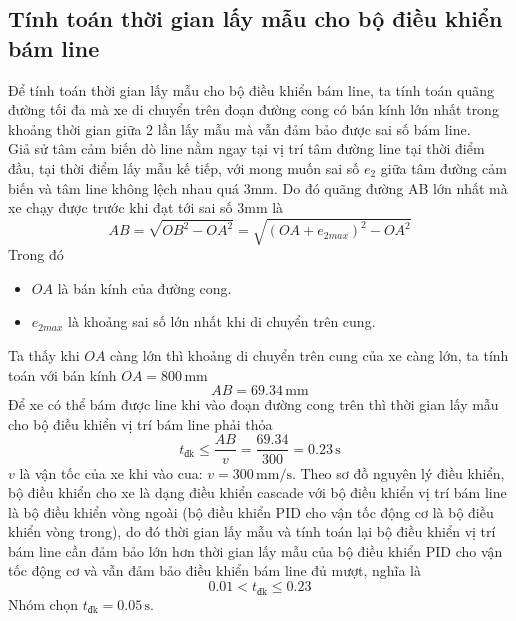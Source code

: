           \subsection{Tính toán thời gian lấy mẫu cho bộ điều khiển bám line}
               \hspace*{0.6cm}Để tính toán thời gian lấy mẫu cho bộ điều khiển bám line, ta tính toán quãng đường tối đa mà xe di chuyển trên đoạn đường cong 
               có bán kính lớn nhất trong khoảng thời gian giữa 2 lần lấy mẫu mà vẫn đảm bảo được sai số bám line.\\
               \hspace*{0.6cm}Giả sử tâm cảm biến dò line nằm ngay tại vị trí tâm đường line tại thời điểm đầu, tại thời điểm lấy mẫu kế tiếp, với mong muốn sai số $e_2$ giữa tâm đường cảm biến 
               và tâm line không lệch nhau quá 3mm. Do đó quãng đường AB lớn nhất mà xe chạy được trước khi đạt tới sai số 3mm là 
               \begin{equation*}
                    AB = \sqrt{OB^2 - OA^2} = \sqrt{(OA + e_{2max})^2 - OA^2}
               \end{equation*}
               \hspace*{0.6cm}Trong đó 
               \begin{itemize}
                    \item $OA$ là bán kính của đường cong.
                    \item $e_{2max}$ là khoảng sai số lớn nhất khi di chuyển trên cung.
               \end{itemize}
               \hspace*{0.6cm}Ta thấy khi $OA$ càng lớn thì khoảng di chuyển trên cung của xe càng lớn, ta tính toán với bán kính $OA = 800 \,\mathrm{mm}$
               \begin{equation*}
                    AB = 69.34 \,\mathrm{mm}
               \end{equation*}
               \hspace*{0.6cm}Để xe có thể bám được line khi vào đoạn đường cong trên thì thời gian lấy mẫu cho bộ điều khiển vị trí bám line phải thỏa 
               \begin{equation*}
                    t_{\text{đk}} \leq \dfrac{AB}{v} = \dfrac{69.34}{300} = 0.23 \,\mathrm{s}
               \end{equation*}
               \hspace*{0.6cm}$v$ là vận tốc của xe khi vào cua: $v = 300 \,\mathrm{mm/s}$. Theo sơ đồ nguyên lý điều khiển, bộ điều khiển cho xe là dạng điều khiển cascade với bộ điều khiển vị trí bám line là bộ điều khiển vòng ngoài (bộ điều khiển PID cho vận tốc động cơ là bộ điều khiển vòng trong), do đó thời gian 
               lấy mẫu và tính toán lại bộ điều khiển vị trí bám line cần đảm bảo lớn hơn thời gian lấy mẫu của bộ điều khiển PID cho vận tốc động cơ và vẫn đảm bảo điều khiển bám line đủ mượt, nghĩa là
               \begin{equation*}
                    0.01 < t_{\text{đk}} \leq 0.23
               \end{equation*}
               \hspace*{0.6cm}Nhóm chọn $t_{\text{đk}} = 0.05 \,\mathrm{s}$.
               

